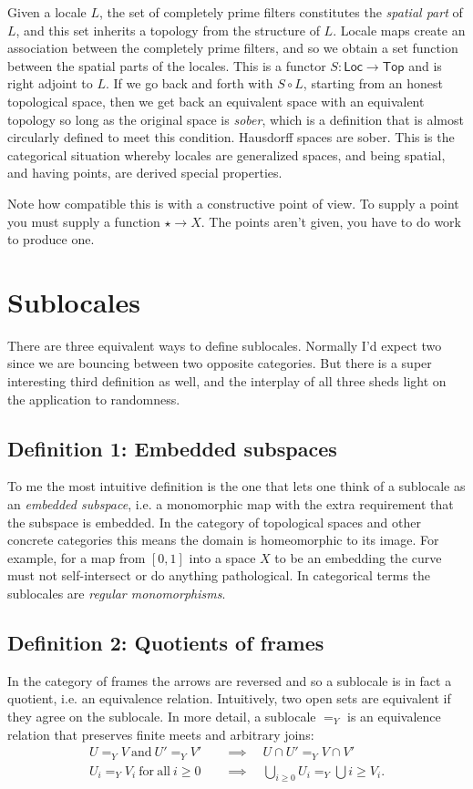 \documentclass[12pt]{extarticle}
\newcommand{\Locale}{\ensuremath{\mathsf{Loc}}}
\newcommand{\Topcat}{\ensuremath{\mathsf{Top}}}
\begin{document}
Given a locale $L$, the set of completely prime filters constitutes the \emph{spatial part} of $L$, and this set inherits a topology from the structure of $L$. Locale maps create an association between the completely prime filters, and so we obtain a set function between the spatial parts of the locales. This is a functor $S:\Locale\to\Topcat$ and is right adjoint to $L$. If we go back and forth with $S\circ L$, starting from an honest topological space, then we get back an equivalent space with an equivalent topology so long as the original space is \emph{sober}, which is a definition that is almost circularly defined to meet this condition. Hausdorff spaces are sober. This is the categorical situation whereby locales are generalized spaces, and being spatial, and having points, are derived special properties.

Note how compatible this is with a constructive point of view. To supply a point you must supply a function $\star\to X$. The points aren't given, you have to do work to produce one.

\section{Sublocales}

There are three equivalent ways to define sublocales. Normally I'd expect two since we are bouncing between two opposite categories. But there is a super interesting third definition as well, and the interplay of all three sheds light on the application to randomness.

\subsection{Definition 1: Embedded subspaces}
To me the most intuitive definition is the one that lets one think of a sublocale as an \emph{embedded subspace}, i.e. a monomorphic map with the extra requirement that the subspace is embedded. In the category of topological spaces and other concrete categories this means the domain is homeomorphic to its image. For example, for a map from $[0,1]$ into a space $X$ to be an embedding the curve must not self-intersect or do anything pathological. In categorical terms the sublocales are \emph{regular monomorphisms}. 

\subsection{Definition 2: Quotients of frames}
In the category of frames the arrows are reversed and so a sublocale is in fact a quotient, i.e. an equivalence relation. Intuitively, two open sets are equivalent if they agree on the sublocale. In more detail, a sublocale $=_Y$ is an equivalence relation that preserves finite meets and arbitrary joins:
\begin{align}
U=_Y V\mathrm{\ and\ }U'=_Y V'&\quad\implies\quad U\cap U'=_Y V\cap V' \\
U_i=_Y V_i\mathrm{\ for\ all\ } i\geq 0&\quad\implies\quad \bigcup_{i\geq 0}U_i =_Y \bigcup{i\geq } V_i.
\end{align}
\end{document}
